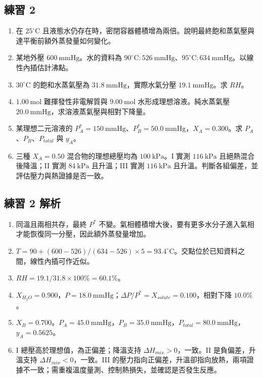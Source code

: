 \documentclass[11pt,a4paper]{article}
\providecommand{\tightlist}{%
  \setlength{\itemsep}{0pt}\setlength{\parskip}{0pt}}
\begin{document}
\subsection{練習 2}\label{ux7df4ux7fd2-2}

\begin{enumerate}
\def\labelenumi{\arabic{enumi}.}
\tightlist
\item
  在 \(25^\circ\mathrm C\) 且液態水仍存在時，密閉容器體積增為兩倍。說明最終飽和蒸氣壓與達平衡前額外蒸發量如何變化。
\item
  某地外壓 \(600\ \mathrm{mmHg}\)。水的資料為 \(90^\circ\mathrm C:526\ \mathrm{mmHg}\)、\(95^\circ\mathrm C:634\ \mathrm{mmHg}\)。以線性內插估計沸點。
\item
  \(30^\circ\mathrm C\) 的飽和水蒸氣壓為 \(31.8\ \mathrm{mmHg}\)，實際水氣分壓 \(19.1\ \mathrm{mmHg}\)。求 \(RH\)。
\item
  \(1.00\ \mathrm{mol}\) 難揮發性非電解質與 \(9.00\ \mathrm{mol}\) 水形成理想溶液。純水蒸氣壓 \(20.0\ \mathrm{mmHg}\)，求溶液蒸氣壓與相對下降量。
\item
  某理想二元溶液的 \(P_A^*=150\ \mathrm{mmHg}\)、\(P_B^*=50.0\ \mathrm{mmHg}\)，\(X_A=0.300\)。求 \(P_A\)、\(P_B\)、\(P_{total}\) 與 \(y_A\)。
\item
  三種 \(X_A=0.50\) 混合物的理想總壓均為 \(100\ \mathrm{kPa}\)。I 實測 \(116\ \mathrm{kPa}\) 且絕熱混合後降溫；II 實測 \(84\ \mathrm{kPa}\) 且升溫；III 實測 \(116\ \mathrm{kPa}\) 且升溫。判斷各組偏差，並評估壓力與熱證據是否一致。
\end{enumerate}

\subsection{練習 2 解析}\label{ux7df4ux7fd2-2-ux89e3ux6790}

\begin{enumerate}
\def\labelenumi{\arabic{enumi}.}
\tightlist
\item
  同溫且兩相共存，最終 \(P^*\) 不變。氣相體積增大後，要有更多水分子進入氣相才能恢復同一分壓，因此額外蒸發量增加。
\item
  \(T=90+(600-526)/(634-526)\times5=93.4^\circ\mathrm C\)。交點位於已知資料之間，線性內插可作近似。
\item
  \(RH=19.1/31.8\times100\%=60.1\%\)。
\item
  \(X_{H_2O}=0.900\)，\(P=18.0\ \mathrm{mmHg}\)；\(\Delta P/P^*=X_{solute}=0.100\)，相對下降 \(10.0\%\)。
\item
  \(X_B=0.700\)。\(P_A=45.0\ \mathrm{mmHg}\)，\(P_B=35.0\ \mathrm{mmHg}\)，\(P_{total}=80.0\ \mathrm{mmHg}\)，\(y_A=0.5625\)。
\item
  I 總壓高於理想值，為正偏差；降溫支持 \(\Delta H_{mix}>0\)，一致。II 是負偏差，升溫支持 \(\Delta H_{mix}<0\)，一致。III 的壓力指向正偏差，升溫卻指向放熱，兩項證據不一致；需重複溫度量測、控制熱損失，並確認是否發生反應。
\end{enumerate}
\end{document}
